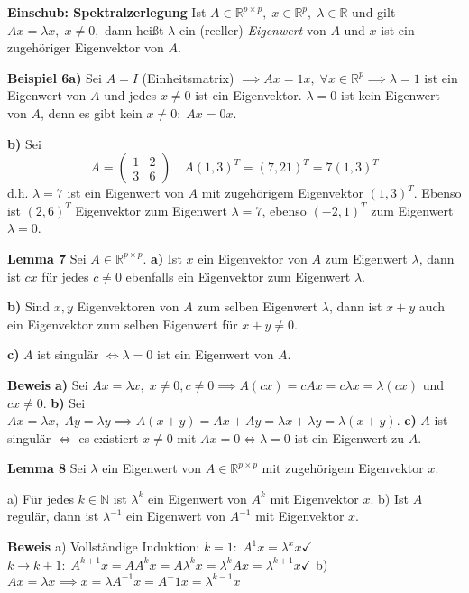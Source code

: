 \documentclass[12pt, a4paper]{article}
\theoremstyle{plain}
\theoremstyle{definition}
\newcommand{\R}{\mathbb{R}}
\newcommand{\N}{\mathbb{N}}
\newcommand{\1}{\mathds{1}}
\begin{document}
\textbf{Einschub: Spektralzerlegung}
Ist $A \in \R^{p\times p}, \; x \in \R^p, \; \lambda \in \R$ und gilt $Ax = \lambda x, \; x \neq 0,$ dann heißt $\lambda$ ein (reeller) \emph{Eigenwert} von $A$ und $x$ ist ein zugehöriger Eigenvektor von $A$.

\textbf{Beispiel 6a)} Sei $A = I$ (Einheitsmatrix) $\implies Ax = 1x, \; \forall  x \in \R^{p} \implies \lambda = 1$ ist ein Eigenwert von $A$ und jedes $x \neq 0 $ ist ein Eigenvektor. $\lambda = 0$ ist kein Eigenwert von $A$, denn es gibt kein $x \neq 0: \; Ax = 0x$.

\textbf{b)} Sei \[A = \begin{pmatrix} 1&2\\3&6    \end{pmatrix}\quad A(1,3)^T = (7, 21)^T = 7 (1, 3)^T \] d.h. $\lambda = 7$ ist ein Eigenwert von $A$ mit zugehörigem Eigenvektor $(1,3)^T$. Ebenso ist $(2,6)^T$ Eigenvektor zum Eigenwert $\lambda = 7$, ebenso $(-2, 1)^T$ zum Eigenwert $\lambda = 0$.

\textbf{Lemma 7} Sei $A \in \R^{p \times p} $. 
\textbf{a)} Ist $x$ ein Eigenvektor von  $A$ zum Eigenwert $\lambda$, dann ist $cx$ für jedes $c \neq 0$ ebenfalls ein Eigenvektor zum Eigenwert $\lambda$.

\textbf{b)} Sind $x,y$ Eigenvektoren von $A$ zum selben Eigenwert $\lambda$, dann ist $x+y$ auch ein Eigenvektor zum selben Eigenwert für $x + y \neq 0$.

\textbf{c)} $A$ ist singulär $\iff \lambda = 0$ ist ein Eigenwert von $A$.

\textbf{Beweis} \textbf{a)} Sei $Ax = \lambda x, \; x \neq 0, c \neq 0 \implies A(cx) = cAx = c\lambda x = \lambda(cx)   $ und $cx \neq 0$.
\textbf{b)} Sei $Ax = \lambda x,\; Ay = \lambda y \implies A(x +y) = Ax + Ay = \lambda x + \lambda y = \lambda (x+y)$.
\textbf{c)} $A$ ist singulär $\iff$ es existiert $x \neq 0$ mit $Ax = 0 \iff \lambda = 0$ ist ein Eigenwert zu $A$.

\textbf{Lemma 8} Sei $\lambda$ ein Eigenwert von $A \in \R^{p \times p} $ mit zugehörigem Eigenvektor $x$.

a) Für jedes $k \in \N$ ist $\lambda^k$ ein Eigenwert von $A^k$ mit Eigenvektor $x$.
b) Ist $A$ regulär, dann ist $\lambda^{-1}$ ein Eigenwert von $A^{-1}$ mit Eigenvektor $x$.

\textbf{Beweis}
a) Vollständige Induktion: $k = 1: \; A^1 x = \lambda^x x \checkmark \quad$ $k \to k+1: \; A^{k+1} x = A A^{k}x = A \lambda^k x = \lambda^k Ax = \lambda^{k+1}x \checkmark$
b) $Ax = \lambda x \implies x= \lambda A^{-1}x=A^-1 x = \lambda^{k -1 }x$
\end{document}
